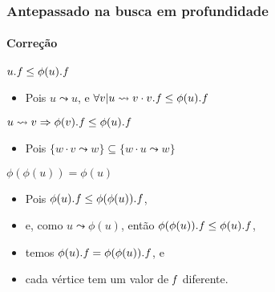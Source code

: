 \documentclass{beamer}
\begin{document}

\begin{frame}
\frametitle{Antepassado na busca em profundidade}
\framesubtitle{Correção}

\alert{$\attrib{u}{f} \le \attrib{\phi(u)}{f}$}

\begin{itemize}
\item Pois $u \leadsto u$, e $\forall v | u \leadsto v \cdot \attrib{v}{f} \le \attrib{\phi(u)}{f}$
\end{itemize}

\alert{$u \leadsto v \Rightarrow \attrib{\phi(v)}{f} \le \attrib{\phi(u)}{f}$}

\begin{itemize}
\item Pois $\{ w \cdot v \leadsto w\} \subseteq \{ w \cdot u \leadsto w\}$
\end{itemize}

\alert{$\phi(\phi(u)) = \phi(u)$}

\begin{itemize}
\item Pois $\attrib{\phi(u)}{f} \le \attrib{\phi(\phi(u))}{f}$,
\item e, como $u \leadsto \phi(u)$, então $\attrib{\phi(\phi(u))}{f} \le \attrib{\phi(u)}{f}$,
\item temos $\attrib{\phi(u)}{f} = \attrib{\phi(\phi(u))}{f}$, e
\item cada vértice tem um valor de $\id{f}$ diferente.
\end{itemize}

\end{frame}


\end{document}
